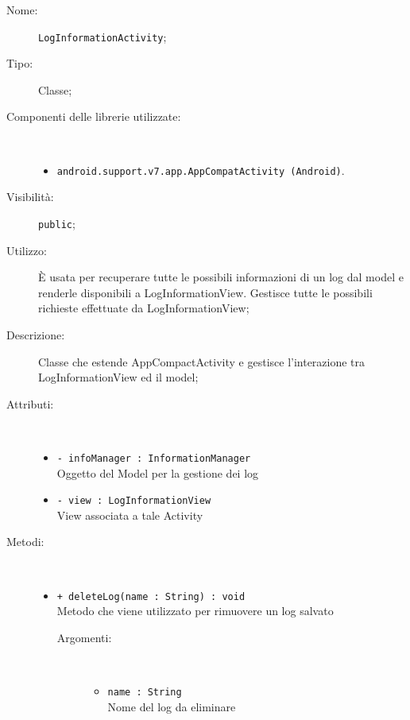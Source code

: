 \documentclass[../DefinizioneDiProdotto.tex]{subfiles}
\begin{document}
\begin{description}
	\item[Nome:] \texttt{LogInformationActivity};
	\item[Tipo:] Classe;
	\item[Componenti delle librerie utilizzate:] \
	\begin{itemize}
		\item \texttt{android.support.v7.app.AppCompatActivity (Android)}.
		
	\end{itemize}
	\item[Visibilità:] \texttt{public};
	\item[Utilizzo:] È usata per recuperare tutte le possibili informazioni di un log dal model e renderle disponibili a LogInformationView. Gestisce tutte le possibili richieste effettuate da LogInformationView;
	\item[Descrizione:] Classe che estende AppCompactActivity e gestisce l'interazione tra LogInformationView ed il model;
	\item[Attributi:] \
	\begin{itemize}
		\item \texttt{- infoManager : InformationManager}\\
		Oggetto del Model per la gestione dei log
		
		\item \texttt{- view : LogInformationView}\\
		View associata a tale Activity
		
	\end{itemize}
	\item[Metodi:] \
	\begin{itemize}
		\item \texttt{+ deleteLog(name : String) : void}\\
		Metodo che viene utilizzato per rimuovere un log salvato
		\begin{description}
			\item[Argomenti:] \
			\begin{itemize}
				\item \texttt{name : String}\\
				Nome del log da eliminare\end{itemize}
		\end{description}
	\end{itemize}
\end{description}
\end{document}
